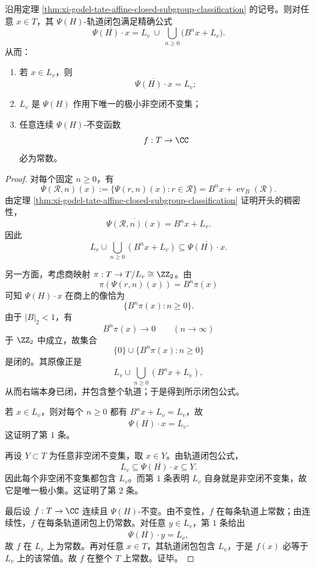 \begin{theorem}\label{thm:xi-godel-tate-affine-orbit-closure-minimal-set}
沿用定理 \ref{thm:xi-godel-tate-affine-closed-subgroup-classification} 的记号。则对任意 \(x\in T\)，其
\(\Psi(H)\)-轨道闭包满足精确公式
\[
\boxed{\;
\overline{\Psi(H)\cdot x}
=
L_v\ \cup\ \bigcup_{n\ge 0}\bigl(B^n x+L_v\bigr).\;}
\]
从而：
\begin{enumerate}
  \item 若 \(x\in L_v\)，则
  \[
  \overline{\Psi(H)\cdot x}=L_v;
  \]
  \item \(L_v\) 是 \(\Psi(H)\) 作用下唯一的极小非空闭不变集；
  \item 任意连续 \(\Psi(H)\)-不变函数
  \[
  f:T\to\CC
  \]
  必为常数。
\end{enumerate}
\end{theorem}
\begin{proof}
对每个固定 \(n\ge 0\)，有
\[
\Psi(\mathcal R,n)(x):=\{\Psi(r,n)(x):r\in\mathcal R\}
=
B^n x+\operatorname{ev}_B(\mathcal R).
\]
由定理 \ref{thm:xi-godel-tate-affine-closed-subgroup-classification} 证明开头的稠密性，
\[
\overline{\Psi(\mathcal R,n)(x)}=B^n x+L_v.
\]
因此
\[
L_v\cup\bigcup_{n\ge 0}(B^n x+L_v)\subseteq \overline{\Psi(H)\cdot x}.
\]

另一方面，考虑商映射 \(\pi:T\to T/L_v\cong\ZZ_2\)。由
\[
\pi(\Psi(r,n)(x))=B^n\pi(x)
\]
可知 \(\Psi(H)\cdot x\) 在商上的像恰为
\[
\{B^n\pi(x):n\ge 0\}.
\]
由于 \(|B|_2<1\)，有
\[
B^n\pi(x)\longrightarrow 0
\qquad (n\to\infty)
\]
于 \(\ZZ_2\) 中成立，故集合
\[
\{0\}\cup\{B^n\pi(x):n\ge 0\}
\]
是闭的。其原像正是
\[
L_v\cup\bigcup_{n\ge 0}(B^n x+L_v),
\]
从而右端本身已闭，并包含整个轨道；于是得到所示闭包公式。

若 \(x\in L_v\)，则对每个 \(n\ge 0\) 都有 \(B^n x+L_v=L_v\)，故
\[
\overline{\Psi(H)\cdot x}=L_v.
\]
这证明了第 \(1\) 条。

再设 \(Y\subset T\) 为任意非空闭不变集，取 \(x\in Y\)。由轨道闭包公式，
\[
L_v\subseteq \overline{\Psi(H)\cdot x}\subseteq Y.
\]
因此每个非空闭不变集都包含 \(L_v\)。而第 \(1\) 条表明 \(L_v\) 自身就是非空闭不变集，故它是唯一极小集。这证明了第 \(2\) 条。

最后设 \(f:T\to\CC\) 连续且 \(\Psi(H)\)-不变。由不变性，\(f\) 在每条轨道上常数；由连续性，\(f\) 在每条轨道闭包上仍常数。对任意 \(y\in L_v\)，第 \(1\) 条给出
\[
\overline{\Psi(H)\cdot y}=L_v,
\]
故 \(f\) 在 \(L_v\) 上为常数。再对任意 \(x\in T\)，其轨道闭包包含 \(L_v\)，于是 \(f(x)\) 必等于 \(L_v\) 上的该常值。故 \(f\) 在整个 \(T\) 上常数。证毕。
\end{proof}
